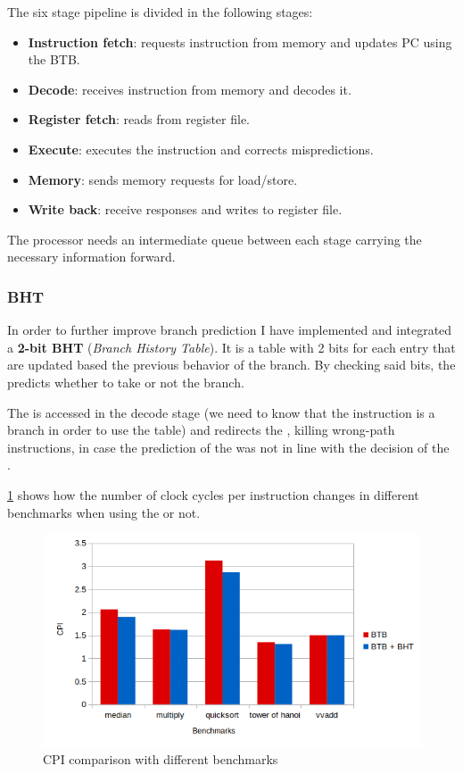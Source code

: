 \documentclass[12pt,oneside,a4paper]{article}
\begin{document}
The six stage pipeline is divided in the following stages:
\begin{itemize}
	\item \textbf{Instruction fetch}: requests instruction from memory and updates PC using the BTB.
	\item \textbf{Decode}: receives instruction from memory and decodes it.
	\item \textbf{Register fetch}: reads from register file.
	\item \textbf{Execute}: executes the instruction and corrects mispredictions.
	\item \textbf{Memory}: sends memory requests for load/store.
	\item \textbf{Write back}: receive responses and writes to register file.
\end{itemize}
The processor needs an intermediate {\selectfont{FIFO}} queue between each stage carrying the necessary information forward.

\subsubsection{BHT}
In order to further improve branch prediction I have implemented and integrated a \textbf{2-bit BHT} (\textit{Branch History Table}). It is a table with 2 bits for each entry that are updated based the previous behavior of the branch. By checking said bits, the {\selectfont{BHT}} predicts whether to take or not the branch.

The {\selectfont{BHT}} is accessed in the decode stage (we need to know that the instruction is a branch in order to use the table) and redirects the {\selectfont{pc}}, killing wrong-path instructions, in case the prediction of the {\selectfont{BTB}} was not in line with the decision of the {\selectfont{BHT}}.

\cref{bhtbench} shows how the number of clock cycles per instruction changes in different benchmarks when using the {\selectfont{BHT}} or not.

\begin{figure}[h]
	\centering
	\includegraphics[scale=0.7]{predbhb}
	\caption{CPI comparison with different benchmarks}
	\label{bhtbench}
\end{figure}
\end{document}

